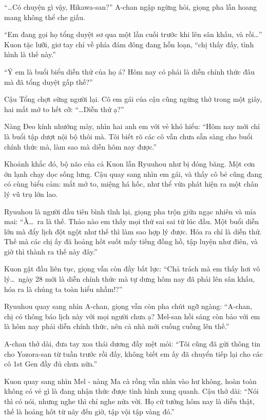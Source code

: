 \documentclass[../main.tex]{subfiles}
\begin{document}
``\dots Có chuyện gì vậy, Hikawa-san?'' A-chan ngập ngừng hỏi, giọng pha lẫn hoang mang không thể che giấu.

``Em đang gọi họ tổng duyệt sơ qua một lần cuối trước khi lên sân khấu, và rồi\dots'' Kuon tặc lưỡi, giơ tay chỉ về phía đám đông đang hỗn loạn, ``chị thấy đấy, tình hình là thế này.''

``Ý em là buổi biểu diễn thử của họ á? Hôm nay có phải là diễn chính thức đâu mà đã tổng duyệt gấp thế?''

Cậu Tổng chợt sững người lại. Cô em gái của cậu cũng ngừng thở trong một giây, hai mắt mở to hết cỡ: ``\dots Diễn thử ạ?''

Nàng Đeo kính nhướng mày, nhìn hai anh em với vẻ khó hiểu: ``Hôm nay mới chỉ là buổi tập dượt nội bộ thôi mà. Tôi biết rõ các cô vẫn chưa sẵn sàng cho buổi chính thức mà, làm sao mà diễn hôm nay được.''

Khoảnh khắc đó, bộ não của cả Kuon lẫn Ryuuhou như bị đóng băng. Một cơn ớn lạnh chạy dọc sống lưng. Cậu quay sang nhìn em gái, và thấy cô bé cũng đang có cùng biểu cảm: mắt mở to, miệng há hốc, như thể vừa phát hiện ra một chân lý vũ trụ lớn lao.

Ryuuhou là người đầu tiên bình tĩnh lại, giọng pha trộn giữa ngạc nhiên và mỉa mai: ``À\dots\ ra là thế. Thảo nào em thấy mọi thứ sai sai từ lúc đầu. Một buổi diễn lớn mà đẩy lịch đột ngột như thế thì làm sao hợp lý được. Hóa ra chỉ là diễn thử. Thế mà các chị ấy đã hoảng hốt suốt mấy tiếng đồng hồ, tập luyện như điên, và giờ thì thành ra thế này đây.''

Kuon gật đầu liên tục, giọng vẫn còn đầy bất lực: ``Chả trách mà em thấy hơi vô lý\dots\ ngày 28 mới là diễn chính thức mà tự dưng hôm nay đã phải lên sân khấu, hóa ra là chúng ta toàn hiểu nhầm!?''

Ryuuhou quay sang nhìn A-chan, giọng vẫn còn pha chút ngỡ ngàng: ``A-chan, chị có thông báo lịch này với mọi người chưa ạ? Mel-san hồi sáng còn bảo với em là hôm nay phải diễn chính thức, nên cả nhà mới cuống cuồng lên thế.''

A-chan thở dài, đưa tay xoa thái dương đầy mệt mỏi: ``Tôi cũng đã gửi thông tin cho Yozora-san từ tuần trước rồi đấy, không biết em ấy đã chuyển tiếp lại cho các cô 1st Gen đầy đủ chưa nữa.''

Kuon quay sang nhìn Mel - nàng Ma cà rồng vẫn nhìn vào hư không, hoàn toàn không có vẻ gì là đang nhận thức được tình hình xung quanh. Cậu thở dài: ``Nói thì có nói, nhưng nghe thì chỉ nghe nửa vời. Họ cứ tưởng hôm nay là diễn thật, thế là hoảng hốt từ nãy đến giờ, tập vội tập vàng đó.''
\end{document}
